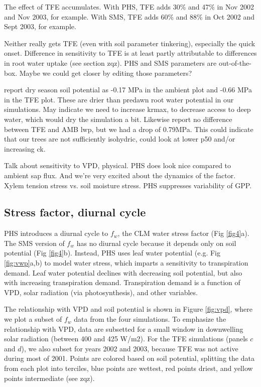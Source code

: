 \documentclass[draft,linenumbers]{agujournal}
\begin{document}
The effect of TFE accumulates.
With PHS, TFE adds 30\% and 47\% in Nov 2002 and Nov 2003, for example.
With SMS, TFE adds 60\% and 88\% in Oct 2002 and Sept 2003, for example.

Neither really gets TFE (even with soil parameter tinkering), especially the quick onset.
Difference in sensitivity to TFE is at least partly attributable to differences in root water uptake (see section zqz).
PHS and SMS parameters are out-of-the-box.
Maybe we could get closer by editing those parameters?

\cite{fisher2006} report dry season soil potential as -0.17 MPa in the ambient plot and -0.66 MPa in the TFE plot.
These are drier than predawn root water potential in our simulations.
May indicate we need to increase krmax, to decrease access to deep water, which would dry the simulation a bit.
Likewise \cite{fisher2006} report no difference between TFE and AMB lwp, but we had a drop of 0.79MPa.
This could indicate that our trees are not sufficiently isohydric, could look at lower p50 and/or increasing ck.

Talk about sensitivity to VPD, physical.
PHS does look nice compared to ambient sap flux.
And we're very excited about the dynamics of the factor.
Xylem tension stress vs. soil moisture stress.
PHS suppresses variability of GPP.


\subsection{Stress factor, diurnal cycle}

PHS introduces a diurnal cycle to $f_w$, the CLM water stress factor (Fig \ref{fig4}a). 
The SMS version of $f_w$ has no diurnal cycle because it depends only on soil potential (Fig \ref{fig4}b).
Instead, PHS uses leaf water potential (e.g. Fig \ref{fig:vwp}a,b) to model water stress, which imparts a sensitivity to transpiration demand.
Leaf water potential declines with decreasing soil potential, but also with increasing transpiration demand.
Transpiration demand is a function of VPD, solar radiation (via photosynthesis), and other variables.

The relationship with VPD and soil potential is shown in Figure \ref{fig:vpd}, where we plot a subset of $f_w$ data from the four simulations. 
To emphasize the relationship with VPD, data are subsetted for a small window in downwelling solar radiation (between 400 and 425 W/m2).
For the TFE simulations (panels $c$ and $d$), we also subset for years 2002 and 2003, because TFE was not active during most of 2001.
Points are colored based on soil potential, splitting the data from each plot into terciles, blue points are wettest, red points driest, and yellow points intermediate (see zqz).
\end{document}
